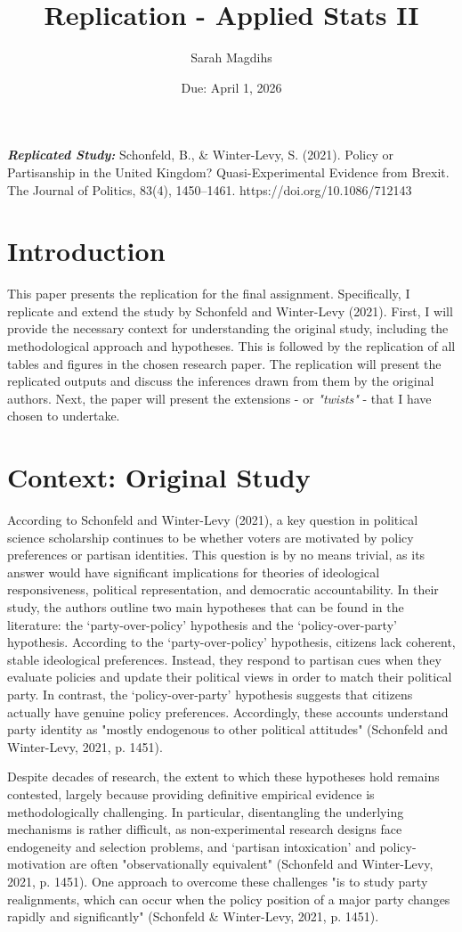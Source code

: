\documentclass[12pt,letterpaper]{article}
\title{Replication - Applied Stats II}
\date{Due: April 1, 2026}
\author{Sarah Magdihs}
\begin{document}
	\maketitle
	\textbf{\textit{Replicated Study:}} Schonfeld, B., \& Winter-Levy, S. (2021). Policy or Partisanship in the United Kingdom? Quasi-Experimental Evidence from Brexit. The Journal of Politics, 83(4), 1450–1461. https://doi.org/10.1086/712143
	\section{Introduction}
	This paper presents the replication for the final assignment. Specifically, I replicate and extend the study by Schonfeld and Winter-Levy (2021). First, I will provide the necessary context for understanding the original study, including the methodological approach and hypotheses. This is followed by the replication of all tables and figures in the chosen research paper. The replication will present the replicated outputs and discuss the inferences drawn from them by the original authors. Next, the paper will present the extensions - or \textit{"twists"} - that I have chosen to undertake.
	
	\section{Context: Original Study}
	According to Schonfeld and Winter-Levy (2021), a key question in political science scholarship continues to be whether voters are motivated by policy preferences or partisan identities. This question is by no means trivial, as its answer would have significant implications for theories of ideological responsiveness, political representation, and democratic accountability. In their study, the authors outline two main hypotheses that can be found in the literature: the ‘party-over-policy’ hypothesis and the ‘policy-over-party’ hypothesis. According to the ‘party-over-policy’ hypothesis, citizens lack coherent, stable ideological preferences. Instead, they respond to partisan cues when they evaluate policies and update their political views in order to match their political party. In contrast, the ‘policy-over-party’ hypothesis suggests that citizens actually have genuine policy preferences. Accordingly, these accounts understand party identity as "mostly endogenous to other political attitudes" (Schonfeld and Winter-Levy, 2021, p. 1451). 
	
	Despite decades of research, the extent to which these hypotheses hold remains contested, largely because providing definitive empirical evidence is methodologically challenging. In particular, disentangling the underlying mechanisms is rather difficult, as non-experimental research designs face endogeneity and selection problems, and ‘partisan intoxication’ and policy-motivation are often "observationally equivalent" (Schonfeld and Winter-Levy, 2021, p. 1451). One approach to overcome these challenges "is to study party realignments, which can occur when the policy position of a major party changes rapidly and significantly" (Schonfeld \& Winter-Levy, 2021, p. 1451). 
	
\end{document}

